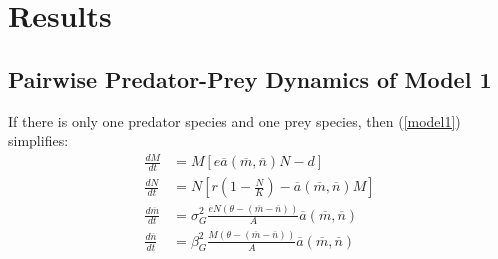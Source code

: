 \documentclass{amsart}
\theoremstyle{definition}
\theoremstyle{remark}
\numberwithin{equation}{section}
\begin{document}
\pagebreak
\section{Results}
\subsection{Pairwise Predator-Prey Dynamics of Model 1}
If there is only one predator species and one prey species, then (\ref{model1}) simplifies:
\begin{subequations}
	\label{MODEL1}
	\begin{align}
		\label{eq:MODEL1_A}
		\frac{dM}{dt} &= M\left[e\overline{a}(\overline{m}, \overline{n})N - d\right] \\[5px]
		\label{eq:MODEL1_B}
		\frac{dN}{dt} &= N\left[r\left(1 - \frac{N}{K}\right) - \overline{a}(\overline{m}, \overline{n})M\right] \\[5px]
		\label{eq:MODEL1_C}
		\frac{d\overline{m}}{dt} &= \sigma_{G}^2\frac{eN(\theta - (\overline{m} - \overline{n}))}{A}\overline{a}(\overline{m}, \overline{n}) \\[5px]
		\label{eq:MODEL1_D}
		\frac{d\overline{n}}{dt} &= \beta_{G}^2\frac{M(\theta - (\overline{m} - \overline{n}))}{A}\overline{a}(\overline{m}, \overline{n})
	\end{align}
\end{subequations}
\end{document}
